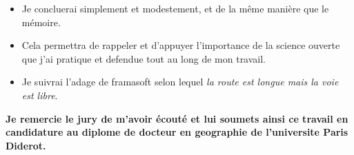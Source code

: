 \documentclass[12pt]{article}
\begin{document}
\bigskip

\begin{itemize}
    \item Je concluerai simplement et modestement, et de la même manière que le mémoire.
	\item Cela permettra de rappeler et d'appuyer l'importance de la science ouverte que j'ai pratique et defendue tout au long de mon travail.
	\item Je suivrai l'adage de framasoft selon lequel \textit{la route est longue mais la voie est libre}.
\end{itemize}


\bigskip

\textbf{
Je remercie le jury de m'avoir écouté et lui soumets ainsi ce travail en candidature au diplome de docteur en geographie de l'universite Paris Diderot.
}













\end{document}
